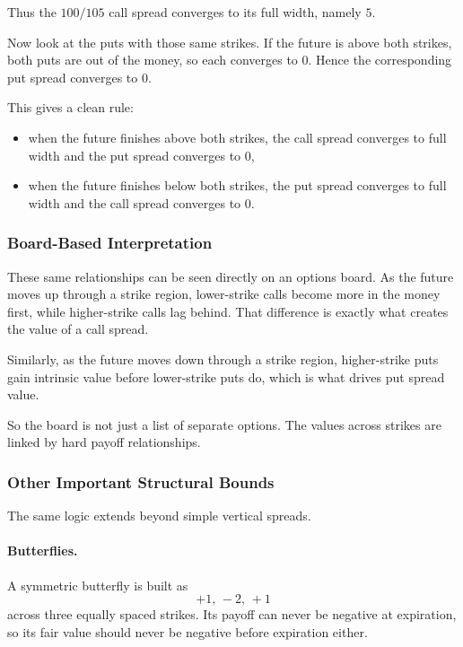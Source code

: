 \documentclass[11pt]{article}
\theoremstyle{definition}
\begin{document}
Thus the \(100/105\) call spread converges to its full width, namely \(5\).

Now look at the puts with those same strikes. If the future is above both strikes, both puts are out of the money, so each converges to \(0\). Hence the corresponding put spread converges to \(0\).

This gives a clean rule:

\begin{itemize}[leftmargin=2em]
    \item when the future finishes above both strikes, the call spread converges to full width and the put spread converges to \(0\),
    \item when the future finishes below both strikes, the put spread converges to full width and the call spread converges to \(0\).
\end{itemize}

\subsubsection{Board-Based Interpretation}

These same relationships can be seen directly on an options board. As the future moves up through a strike region, lower-strike calls become more in the money first, while higher-strike calls lag behind. That difference is exactly what creates the value of a call spread.

Similarly, as the future moves down through a strike region, higher-strike puts gain intrinsic value before lower-strike puts do, which is what drives put spread value.

So the board is not just a list of separate options. The values across strikes are linked by hard payoff relationships.

\subsubsection{Other Important Structural Bounds}

The same logic extends beyond simple vertical spreads.

\paragraph{Butterflies.}
A symmetric butterfly is built as
\[
+1,\,-2,\,+1
\]
across three equally spaced strikes. Its payoff can never be negative at expiration, so its fair value should never be negative before expiration either.
\end{document}
